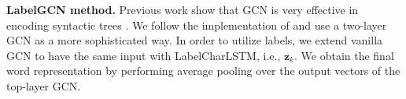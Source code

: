 


\textbf{LabelGCN method.} 
Previous work show that GCN is very effective in encoding
syntactic trees \cite{marcheggiani-titov-2017,zhang-etal-2018}. 
We follow the implementation of \citet{zhang-etal-2018} and use a two-layer GCN as a more sophisticated way. %
In order to utilize labels, we extend vanilla GCN to have the same input with 
LabelCharLSTM, i.e., $\mathbf{z}_{k}$.
We obtain the final word representation by performing average pooling over the output vectors of the top-layer GCN.  
